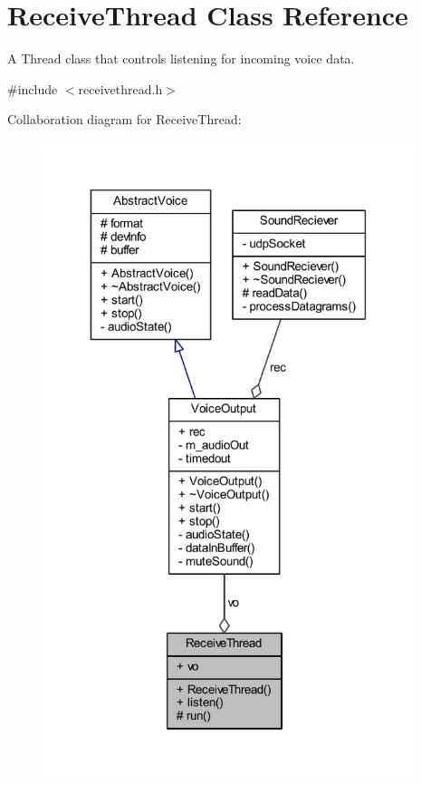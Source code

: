 \hypertarget{class_receive_thread}{
\section{\-Receive\-Thread \-Class \-Reference}
\label{class_receive_thread}
}


\-A \-Thread class that controls listening for incoming voice data.  




{\ttfamily \#include $<$receivethread.\-h$>$}



\-Collaboration diagram for \-Receive\-Thread\-:\nopagebreak
\begin{figure}[H]
\begin{center}
\leavevmode
\includegraphics[width=307pt]{class_receive_thread__coll__graph}
\end{center}
\end{figure}
